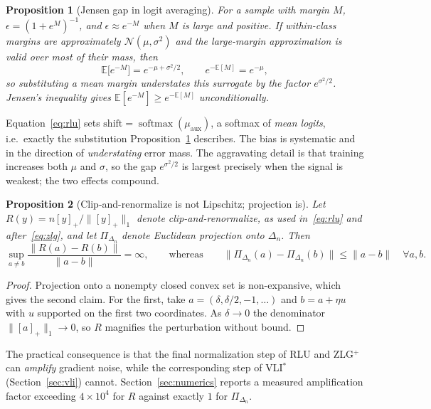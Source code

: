 \documentclass[11pt]{article}
\newtheorem{proposition}{Proposition}
\theoremstyle{remark}
\newcommand{\E}{\mathbb{E}}
\newcommand{\pos}[1]{\left[#1\right]_+}
\newcommand{\simplex}{\Delta_n}
\DeclareMathOperator{\softmax}{softmax}
\begin{document}
\begin{proposition}[Jensen gap in logit averaging]
\label{prop:jensen}
For a sample with margin $M$, $\epsilon = (1+e^M)^{-1}$, and
$\epsilon \approx e^{-M}$ when $M$ is large and positive. If within-class
margins are approximately $\mathcal N(\mu,\sigma^2)$ and the large-margin
approximation is valid over most of their mass, then
\[
 \E\bigl[e^{-M}\bigr] = e^{-\mu + \sigma^2/2},
 \qquad e^{-\E[M]} = e^{-\mu},
\]
so substituting a mean margin understates this surrogate by the factor
$e^{\sigma^2/2}$. Jensen's inequality gives
$\E[e^{-M}] \ge e^{-\E[M]}$ unconditionally.
\end{proposition}

Equation~\eqref{eq:rlu} sets $\mathrm{shift} = \softmax(\mu_{\mathrm{aux}})$,
a softmax of \emph{mean logits}, i.e.\ exactly the substitution
Proposition~\ref{prop:jensen} describes. The bias is systematic and in the
direction of \emph{understating} error mass. The aggravating detail is that
training increases both $\mu$ and $\sigma$, so the gap $e^{\sigma^2/2}$ is
largest precisely when the signal is weakest; the two effects compound.

\begin{proposition}[Clip-and-renormalize is not Lipschitz; projection is]
\label{prop:lip}
Let $R(y) = n\pos{y}/\|\pos{y}\|_1$ denote clip-and-renormalize, as used
in~\eqref{eq:rlu} and after~\eqref{eq:zlg}, and let $\Pi_{\simplex}$ denote
Euclidean projection onto $\simplex$. Then
\[
 \sup_{a \ne b} \frac{\|R(a)-R(b)\|}{\|a-b\|} = \infty,
 \qquad\text{whereas}\qquad
 \|\Pi_{\simplex}(a) - \Pi_{\simplex}(b)\| \le \|a-b\| \quad \forall a,b .
\]
\end{proposition}

\begin{proof}
Projection onto a nonempty closed convex set is non-expansive, which gives
the second claim. For the first, take $a = (\delta, \delta/2, -1, \ldots)$
and $b = a + \eta u$ with $u$ supported on the first two coordinates. As
$\delta \to 0$ the denominator $\|\pos{a}\|_1 \to 0$, so $R$ magnifies the
perturbation without bound.
\end{proof}

The practical consequence is that the final normalization step of RLU and
ZLG$^+$ can \emph{amplify} gradient noise, while the corresponding step of
VLI$^*$ (Section~\ref{sec:vli}) cannot. Section~\ref{sec:numerics} reports a
measured amplification factor exceeding $4\times 10^4$ for $R$ against
exactly $1$ for $\Pi_{\simplex}$.
\end{document}
